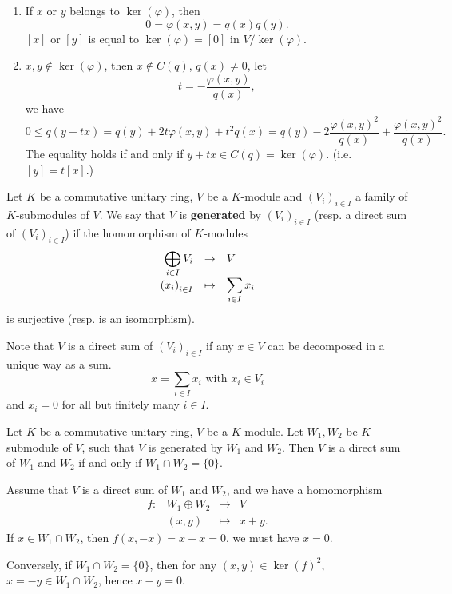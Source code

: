 \begin{proofenv}
    \quad
    \begin{enumerate}[label=(\roman*)]
        \item If $x$ or $y$ belongs to $\ker(\varphi)$, then
        $$ 0 =\varphi(x,y) = q(x)q(y).$$
        $[x]$ or $[y]$ is equal to $\ker(\varphi) =[0]$ in $V/\ker(\varphi)$.
        \item $x,y\notin \ker(\varphi)$, then $x\notin C(q)$, $q(x)\neq 0$, let
        $$ t = - \frac{\varphi(x,y)}{q(x)},$$
        we have 
        $$ 0\le q(y+tx) = q(y) +2t\varphi(x,y) +t^2q(x) = q(y) - 2\frac{\varphi(x,y)^2}{q(x)} + \frac{\varphi(x,y)^2}{q(x)}.$$
        The equality holds if and only if $y +tx \in C(q) = \ker(\varphi).$ (i.e. $[y] = t[x]$.)
    \end{enumerate}
\end{proofenv}
\begin{definitionenv}
    Let $K$ be a commutative unitary ring, $V$ be a $K$-module and $\left(V_i\right)_{i\in I}$ a family of $K$-submodules of $V$.
    We say that $V$ is \textbf{generated} by $\left(V_i\right)_{i\in I}$ (resp. a direct sum of $\left(V_i\right)_{i\in I}$) if the homomorphism of $K$-modules
    $$ \begin{array}{rcl}
        \displaystyle \bigoplus _{i\in I} V_i & \rightarrow & V\\
        \left(x_i\right)_{i\in I} & \mapsto & \displaystyle \sum_{i\in I} x_i
    \end{array}$$
    is surjective (resp. is an isomorphism). 
    
    \quad Note that $V$ is a direct sum of $\left(V_i\right)_{i\in I}$ if any $x\in V$ can be decomposed in a unique way as a sum.
    $$ x = \sum_{i\in I} x_i \text{ with } x_i \in V_i$$
    and $x_i=0$ for all but finitely many $i\in I$.
\end{definitionenv}
\begin{propositionenv}
    Let $K$ be a commutative unitary ring, $V$ be a $K$-module. Let $W_1,W_2$ be $K$-submodule of $V$, such that $V$ is generated by $W_1$ and $W_2$. 
    Then $V$ is a direct sum of $W_1$ and $W_2$ if and only if $W_1\cap W_2 =\{0\}$.
\end{propositionenv}
\begin{proofenv}
    Assume that $V$ is a direct sum of $W_1$ and $W_2$, and we have a homomorphism
    $$ \begin{array}{rrcl}
        f: & W_1\oplus W_2 & \rightarrow & V\\
        & (x,y) & \mapsto & x+y.
    \end{array}$$
    If $x\in W_1\cap W_2$, then $f(x, -x) = x - x = 0$, we must have $x = 0$.

    \quad Conversely, if $W_1\cap W_2 =\{0\}$, then for any $(x,y)\in \ker(f)^2$, $x = - y \in W_1\cap W_2$, hence $x - y = 0$.
\end{proofenv}
